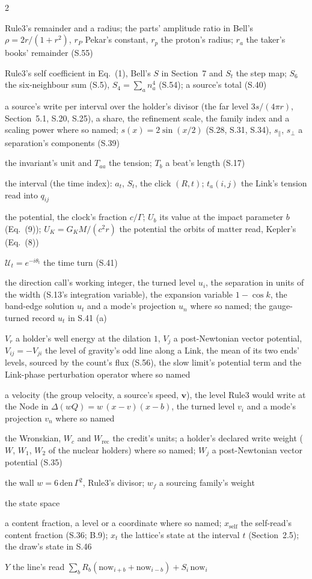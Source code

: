 \documentclass[pdflatex,sn-mathphys-num]{sn-jnl}
\newcommand{\den}{\mathrm{den}}
\newcommand{\Wc}{W_c}
\newcommand{\nom}[2]{\item[{#1}] #2}
\theoremstyle{thmstyleone}
\begin{document}
\begin{multicols}{2}
\begin{description}[style=unboxed,leftmargin=0pt,itemsep=0pt,parsep=0pt,font=\normalfont]
\nom{$r$}{Rule3's remainder and a radius; the parts' amplitude ratio in Bell's $\rho = 2r / (1 + r^2)$, $r_P$ Pekar's constant, $r_p$ the proton's radius; $r_a$ the taker's books' remainder (S.55)}
\nom{$S$}{Rule3's self coefficient in Eq.~(1), Bell's $S$ in Section~7 and $S_t$ the step map; $S_6$ the six-neighbour sum (S.5), $S_4 = \sum_a n_a^4$ (S.54); a source's total (S.40)}
\nom{$s$}{a source's write per interval over the holder's divisor (the far level $3s / (4\pi r)$, Section~5.1, S.20, S.25), a share, the refinement scale, the family index and a scaling power where so named; $s(x) = 2\sin(x / 2)$ (S.28, S.31, S.34), $s_\parallel$, $s_\perp$ a separation's components (S.39)}
\nom{$T$}{the invariant's unit and $T_{aa}$ the tension; $T_b$ a beat's length (S.17)}
\nom{$t$}{the interval (the time index): $a_t$, $S_t$, the click $(R, t)$; $t_a(i, j)$ the Link's tension read into $q_{ij}$}
\nom{$U$}{the potential, the clock's fraction $c / \Gamma$; $U_b$ its value at the impact parameter $b$ (Eq.~(9)); $U_K = G_K M / (c^2 r)$ the potential the orbits of matter read, Kepler's (Eq.~(8))}
\nom{$\mathcal U$}{$\mathcal U_t = e^{-i\theta_t}$ the time turn (S.41)}
\nom{$u$}{the direction call's working integer, the turned level $u_i$, the separation in units of the width (S.13's integration variable), the expansion variable $1 - \cos k$, the band-edge solution $u_t$ and a mode's projection $u_n$ where so named; the gauge-turned record $u_t$ in S.41 (a)}
\nom{$V$}{$V_r$ a holder's well energy at the dilation $1$, $V_j$ a post-Newtonian vector potential, $V_{ij} = -V_{ji}$ the level of gravity's odd line along a Link, the mean of its two ends' levels, sourced by the count's flux (S.56), the slow limit's potential term and the Link-phase perturbation operator where so named}
\nom{$v$}{a velocity (the group velocity, a source's speed, $\mathbf v$), the level Rule3 would write at the Node in $\Delta(wQ) = w\,(x - v)(x - b)$, the turned level $v_i$ and a mode's projection $v_n$ where so named}
\nom{$W$}{the Wronskian, $\Wc$ and $W_{\mathrm{rec}}$ the credit's units; a holder's declared write weight ($W$, $W_1$, $W_2$ of the nuclear holders) where so named; $W_j$ a post-Newtonian vector potential (S.35)}
\nom{$w$}{the wall $w = 6\,\den\,\Gamma^2$, Rule3's divisor; $w_f$ a sourcing family's weight}
\nom{$X$}{the state space}
\nom{$x$}{a content fraction, a level or a coordinate where so named; $x_{\mathrm{self}}$ the self-read's content fraction (S.36; B.9); $x_t$ the lattice's state at the interval $t$ (Section~2.5); the draw's state in S.46}
\nom{$Y$}{$Y$ the line's read $\sum_b R_b(\mathrm{now}_{i+b} + \mathrm{now}_{i-b}) + S_i\,\mathrm{now}_i$}

\end{description}
\end{multicols}
\end{document}
